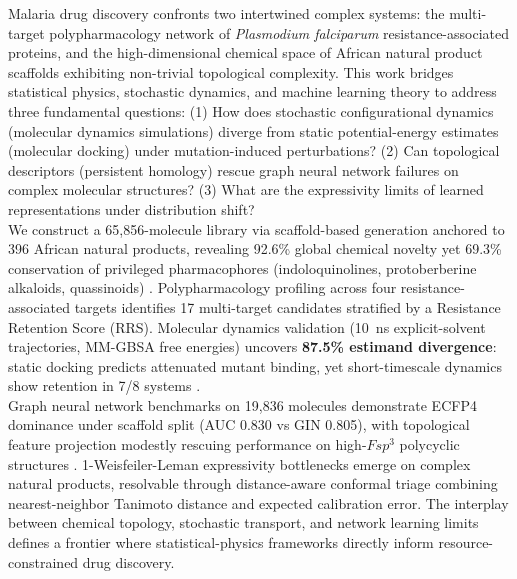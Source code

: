 \documentclass[12pt,a4paper]{article}
\begin{document}
\noindent
Malaria drug discovery confronts two intertwined complex systems: the multi-target polypharmacology network of \textit{Plasmodium falciparum} resistance-associated proteins, and the high-dimensional chemical space of African natural product scaffolds exhibiting non-trivial topological complexity. This work bridges statistical physics, stochastic dynamics, and machine learning theory to address three fundamental questions: (1) How does stochastic configurational dynamics (molecular dynamics simulations) diverge from static potential-energy estimates (molecular docking) under mutation-induced perturbations? (2) Can topological descriptors (persistent homology) rescue graph neural network failures on complex molecular structures? (3) What are the expressivity limits of learned representations under distribution shift?\\
%
We construct a 65,856-molecule library via scaffold-based generation anchored to 396 African natural products, revealing 92.6\% global chemical novelty yet 69.3\% conservation of privileged pharmacophores (indoloquinolines, protoberberine alkaloids, quassinoids) \cite{p1chemrxiv}. Polypharmacology profiling across four resistance-associated targets identifies 17 multi-target candidates stratified by a Resistance Retention Score (RRS). Molecular dynamics validation (10~ns explicit-solvent trajectories, MM-GBSA free energies) uncovers \textbf{87.5\% estimand divergence}: static docking predicts attenuated mutant binding, yet short-timescale dynamics show retention in 7/8 systems \cite{p2chemrxiv}.\\
%
Graph neural network benchmarks on 19,836 molecules demonstrate ECFP4 dominance under scaffold split (AUC 0.830 vs GIN 0.805), with topological feature projection modestly rescuing performance on high-$Fsp^3$ polycyclic structures \cite{p3chemrxiv}. 1-Weisfeiler-Leman expressivity bottlenecks emerge on complex natural products, resolvable through distance-aware conformal triage combining nearest-neighbor Tanimoto distance and expected calibration error. The interplay between chemical topology, stochastic transport, and network learning limits defines a frontier where statistical-physics frameworks directly inform resource-constrained drug discovery.\\
%

\end{document}
